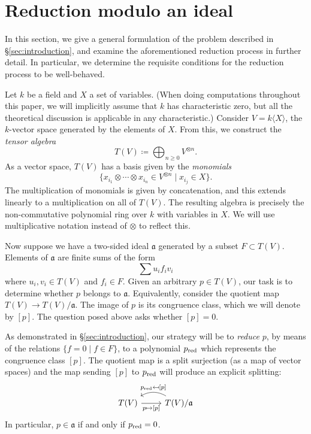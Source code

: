 \section{Reduction modulo an ideal}\label{sec:grobner-theorem}
In this section, we give a general formulation of the problem described in \S\ref{sec:introduction}, and examine the aforementioned reduction process in further detail. In particular, we determine the requisite conditions for the reduction process to be well-behaved.

Let $k$ be a field and $X$ a set of variables. (When doing computations throughout this paper, we will implicitly assume that $k$ has characteristic zero, but all the theoretical discussion is applicable in any characteristic.) Consider $V = k\langle X \rangle$, the $k$-vector space generated by the elements of $X$. From this, we construct the \emph{tensor algebra}
\[
	T(V) \coloneqq \bigoplus_{n\geq 0} V^{\otimes n}.
\]
As a vector space, $T(V)$ has a basis given by the \emph{monomials}
\[
	\{x_{i_1}\otimes \cdots \otimes x_{i_n} \in V^{\otimes n} \mid x_{i_j} \in X\}.
\]
The multiplication of monomials is given by concatenation, and this extends linearly to a multiplication on all of $T(V)$. The resulting algebra is precisely the non-commutative polynomial ring over $k$ with variables in $X$. We will use multiplicative notation instead of $\otimes$ to reflect this.

Now suppose we have a two-sided ideal $\mathfrak{a}$ generated by a subset $F\subset T(V)$. Elements of $\mathfrak{a}$ are finite sums of the form
\[
	\sum u_i f_i v_i
\]
where $u_i, v_i \in T(V)$ and $f_i \in F$.
Given an arbitrary $p\in T(V)$, our task is to determine whether $p$ belongs to $\mathfrak{a}$. Equivalently, consider the quotient map $T(V) \to T(V)/\mathfrak{a}$. The image of $p$ is its congruence class, which we will denote by $[p]$. The question posed above asks whether $[p]=0$.

As demonstrated in \S\ref{sec:introduction}, our strategy will be to \emph{reduce} $p$, by means of the relations $\{f=0 \mid f\in F\}$, to a polynomial $p_{\mathrm{red}}$ which represents the congruence class $[p]$. The quotient map is a split surjection (as a map of vector spaces) and the map sending $[p]$ to $p_{\mathrm{red}}$ will produce an explicit splitting:
\[\begin{tikzcd}
	T(V) \arrow[r, "p \mapsto {[p]}",swap] & \arrow[l,bend right, swap," p_\red \mapsfrom {[p]}"] T(V)/\mathfrak{a}
\end{tikzcd}\]
In particular, $p \in \mathfrak{a}$ if and only if $p_{\mathrm{red}} = 0$.

